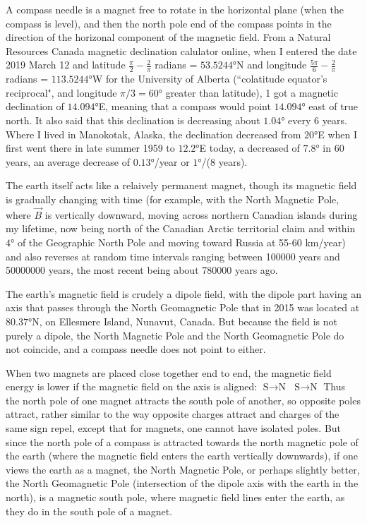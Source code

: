 A compass needle is a magnet free to rotate in the horizontal plane (when the compass is level), and then the north pole end of the compass points in the direction of the horizonal component of the magnetic field. From a Natural Resources Canada magnetic declination calulator online, when I entered the date 2019 March 12 and latitude $\frac{\pi}{2} - \frac{2}{\pi}$ radians = $\ang{53.5244}$N and longitude $\frac{5\pi}{6} - \frac{2}{\pi}$ radians = $\ang{113.5244}$W for the University of Alberta (``colatitude equator's reciprocal", and longitude $\pi/3 = \ang{60}$ greater than latitude), 1 got a magnetic declination of $\ang{14.094}$E, meaning that a compass would point $\ang{14.094}$ east of true north. It also said that this declination is decreasing about $\ang{1.04}$ every 6 years. Where I lived in Manokotak, Alaska, the declination decreased from $\ang{20}$E when I first went there in late summer 1959 to $\ang{12.2}$E today, a decreased of $\ang{7.8}$ in 60 years, an average decrease of $\ang{0.13}$/year or $\ang{1}$/(8 years).

The earth itself acts like a relaively permanent magnet, though its magnetic field is gradually changing with time (for example, with the North Magnetic Pole, where $\vec{B}$ is vertically downward, moving across northern Canadian islands during my lifetime, now being north of the Canadian Arctic territorial claim and within $\ang{4}$ of the Geographic North Pole and moving toward Russia at 55-60 km/year) and also reverses at random time intervals ranging between 100000 years and 50000000 years, the most recent being about 780000 years ago.

The earth's magnetic field is crudely a dipole field, with the dipole part having an axis that passes through the North Geomagnetic Pole that in 2015 was located at $\ang{80.37}$N, on Ellesmere Island, Nunavut, Canada. But because the field is not purely a dipole, the North Magnetic Pole and the North Geomagnetic Pole do not coincide, and a compass needle does not point to either.

When two magnets are placed close together end to end, the magnetic field energy is lower if the magnetic field on the axis is aligned: $\boxed{\text{S} \rightarrow \text{N}}$  $\boxed{\text{S} \rightarrow \text{N}}$ Thus the north pole of one magnet attracts the south pole of another, so opposite poles attract, rather similar to the way opposite charges attract and charges of the same sign repel, except that for magnets, one cannot have isolated poles. But since the north pole of a compass is attracted towards the north magnetic pole of the earth (where the magnetic field enters the earth vertically downwards), if one views the earth as a magnet, the North Magnetic Pole, or perhaps slightly better, the North Geomagnetic Pole (intersection of the dipole axis with the earth in the north), is a magnetic south pole, where magnetic field lines enter the earth, as they do in the south pole of a magnet.

